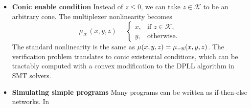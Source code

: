 \documentclass[10pt]{article}
\theoremstyle{remark}
\theoremstyle{definition}
\theoremstyle{plain}
\begin{document}
\begin{itemize}
	\item \textbf{Conic enable condition} Instead of $z \leq 0$, we can take
	$z\in\mathcal{K}$ to be an arbitrary cone. The multiplexer nonlinearity
	becomes 
	\[
		\mu_\mathcal{K}(x,y,z)
		=
		\left\{
		\begin{array}{ll}
			x, & \text{if } z \in \mathcal{K},\\
			y, & \text{otherwise}.
		\end{array}
		\right.
	\]
	The standard nonlinearity is the same as $\mu(x,y,z) =
	\mu_{-\mathbb{R}}(x,y,z)$. The verification problem translates to
	conic existential conditions, which can be tractably computed with a
	convex modification to the DPLL algorithm in SMT solvers.
	\item \textbf{Simulating simple programs} Many programs can be written as if-then-else networks. In

\end{itemize}
\end{document}

